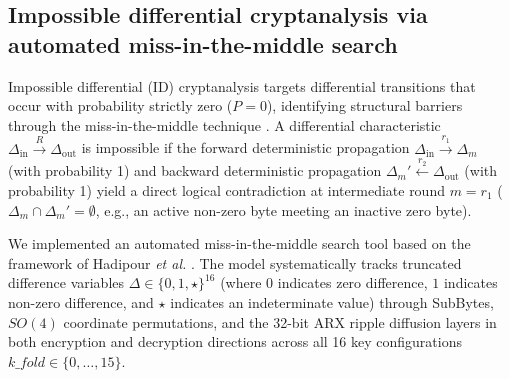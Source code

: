 \documentclass[10pt,twocolumn]{article}
\begin{document}
\subsection{Impossible differential cryptanalysis via automated miss-in-the-middle search}
Impossible differential (ID) cryptanalysis targets differential transitions that occur with probability strictly zero ($P = 0$), identifying structural barriers through the miss-in-the-middle technique \cite{hadipour2023impossible}. A differential characteristic $\Delta_{\text{in}} \xrightarrow{R} \Delta_{\text{out}}$ is impossible if the forward deterministic propagation $\Delta_{\text{in}} \xrightarrow{r_1} \Delta_{m}$ (with probability 1) and backward deterministic propagation $\Delta_{m}' \xleftarrow{r_2} \Delta_{\text{out}}$ (with probability 1) yield a direct logical contradiction at intermediate round $m = r_1$ ($\Delta_m \cap \Delta_m' = \emptyset$, e.g., an active non-zero byte meeting an inactive zero byte).

We implemented an automated miss-in-the-middle search tool based on the framework of Hadipour \textit{et al.} \cite{hadipour2023impossible}. The model systematically tracks truncated difference variables $\Delta \in \{0, 1, \star\}^{16}$ (where $0$ indicates zero difference, $1$ indicates non-zero difference, and $\star$ indicates an indeterminate value) through SubBytes, $SO(4)$ coordinate permutations, and the 32-bit ARX ripple diffusion layers in both encryption and decryption directions across all 16 key configurations $\mathit{k\_fold} \in \{0, \dots, 15\}$.
\end{document}
